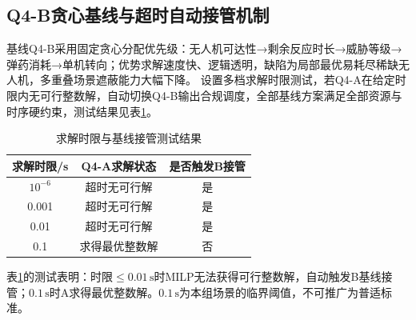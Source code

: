 \documentclass[withoutpreface,bwprint]{cumcmthesis}
\begin{document}
\subsection{Q4-B贪心基线与超时自动接管机制}
基线Q4-B采用固定贪心分配优先级：无人机可达性→剩余反应时长→威胁等级→弹药消耗→单机转向；优势求解速度快、逻辑透明，缺陷为局部最优易耗尽稀缺无人机，多重叠场景遮蔽能力大幅下降。
设置多档求解时限测试，若Q4-A在给定时限内无可行整数解，自动切换Q4-B输出合规调度，全部基线方案满足全部资源与时序硬约束，测试结果见表\ref{tab:timeout}。
\begin{table}[htbp]
	\centering
	\caption{求解时限与基线接管测试结果}
	\label{tab:timeout}
	\begin{tabular}{ccc}
		\toprule
		求解时限/s & Q4-A求解状态 & 是否触发B接管 \\
		\midrule
		$10^{-6}$ & 超时无可行解 & 是 \\
		0.001 & 超时无可行解 & 是 \\
		0.01 & 超时无可行解 & 是 \\
		0.1 & 求得最优整数解 & 否 \\
		\bottomrule
	\end{tabular}
\end{table}

表\ref{tab:timeout}的测试表明：时限$\leq0.01\,\text{s}$时MILP无法获得可行整数解，自动触发B基线接管；$0.1\,\text{s}$时A求得最优整数解。$0.1\,\text{s}$为本组场景的临界阈值，不可推广为普适标准。
\end{document}
